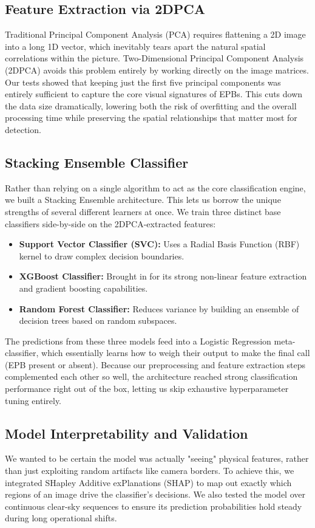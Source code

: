 \subsection{Feature Extraction via 2DPCA}
Traditional Principal Component Analysis (PCA) requires flattening a 2D image into a long 1D vector, which inevitably tears apart the natural spatial correlations within the picture. Two-Dimensional Principal Component Analysis (2DPCA) avoids this problem entirely by working directly on the image matrices. Our tests showed that keeping just the first five principal components was entirely sufficient to capture the core visual signatures of EPBs. This cuts down the data size dramatically, lowering both the risk of overfitting and the overall processing time while preserving the spatial relationships that matter most for detection.

\subsection{Stacking Ensemble Classifier}
Rather than relying on a single algorithm to act as the core classification engine, we built a Stacking Ensemble architecture. This lets us borrow the unique strengths of several different learners at once. We train three distinct base classifiers side-by-side on the 2DPCA-extracted features:
\begin{itemize}
    \item \textbf{Support Vector Classifier (SVC):} Uses a Radial Basis Function (RBF) kernel to draw complex decision boundaries.
    \item \textbf{XGBoost Classifier:} Brought in for its strong non-linear feature extraction and gradient boosting capabilities.
    \item \textbf{Random Forest Classifier:} Reduces variance by building an ensemble of decision trees based on random subspaces.
\end{itemize}
The predictions from these three models feed into a Logistic Regression meta-classifier, which essentially learns how to weigh their output to make the final call (EPB present or absent). Because our preprocessing and feature extraction steps complemented each other so well, the architecture reached strong classification performance right out of the box, letting us skip exhaustive hyperparameter tuning entirely.

\subsection{Model Interpretability and Validation}
We wanted to be certain the model was actually "seeing" physical features, rather than just exploiting random artifacts like camera borders. To achieve this, we integrated SHapley Additive exPlanations (SHAP) to map out exactly which regions of an image drive the classifier's decisions. We also tested the model over continuous clear-sky sequences to ensure its prediction probabilities hold steady during long operational shifts.

